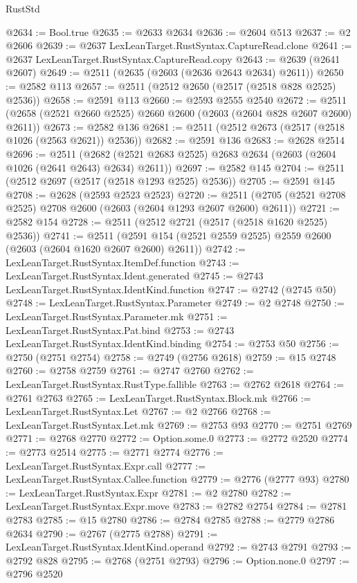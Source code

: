\begin{lexlean}{RustStd}
\begin{coremodule}
@2634 := Bool.true
@2635 := @2633 @2634
@2636 := @2604 @513
@2637 := @2 @2606
@2639 := @2637 LexLeanTarget.RustSyntax.CaptureRead.clone
@2641 := @2637 LexLeanTarget.RustSyntax.CaptureRead.copy
@2643 := @2639 (@2641 @2607)
@2649 := @2511 (@2635 (@2603 (@2636 @2643 @2634) @2611))
@2650 := @2582 @113
@2657 := @2511 (@2512 @2650 (@2517 (@2518 @828 @2525) @2536))
@2658 := @2591 @113
@2660 := @2593 @2555 @2540
@2672 := @2511 (@2658 (@2521 @2660 @2525) @2660 @2600 (@2603 (@2604 @828 @2607 @2600) @2611))
@2673 := @2582 @136
@2681 := @2511 (@2512 @2673 (@2517 (@2518 @1026 (@2563 @2621)) @2536))
@2682 := @2591 @136
@2683 := @2628 @2514
@2696 := @2511
    (@2682 (@2521 @2683 @2525) @2683 @2634 (@2603 (@2604 @1026 (@2641 @2643) @2634) @2611))
@2697 := @2582 @145
@2704 := @2511 (@2512 @2697 (@2517 (@2518 @1293 @2525) @2536))
@2705 := @2591 @145
@2708 := @2628 (@2593 @2523 @2523)
@2720 := @2511 (@2705 (@2521 @2708 @2525) @2708 @2600 (@2603 (@2604 @1293 @2607 @2600) @2611))
@2721 := @2582 @154
@2728 := @2511 (@2512 @2721 (@2517 (@2518 @1620 @2525) @2536))
@2741 := @2511 (@2591 @154 (@2521 @2559 @2525) @2559 @2600 (@2603 (@2604 @1620 @2607 @2600) @2611))
@2742 := LexLeanTarget.RustSyntax.ItemDef.function
@2743 := LexLeanTarget.RustSyntax.Ident.generated
@2745 := @2743 LexLeanTarget.RustSyntax.IdentKind.function
@2747 := @2742 (@2745 @50)
@2748 := LexLeanTarget.RustSyntax.Parameter
@2749 := @2 @2748
@2750 := LexLeanTarget.RustSyntax.Parameter.mk
@2751 := LexLeanTarget.RustSyntax.Pat.bind
@2753 := @2743 LexLeanTarget.RustSyntax.IdentKind.binding
@2754 := @2753 @50
@2756 := @2750 (@2751 @2754)
@2758 := @2749 (@2756 @2618)
@2759 := @15 @2748
@2760 := @2758 @2759
@2761 := @2747 @2760
@2762 := LexLeanTarget.RustSyntax.RustType.fallible
@2763 := @2762 @2618
@2764 := @2761 @2763
@2765 := LexLeanTarget.RustSyntax.Block.mk
@2766 := LexLeanTarget.RustSyntax.Let
@2767 := @2 @2766
@2768 := LexLeanTarget.RustSyntax.Let.mk
@2769 := @2753 @93
@2770 := @2751 @2769
@2771 := @2768 @2770
@2772 := Option.some.{0}
@2773 := @2772 @2520
@2774 := @2773 @2514
@2775 := @2771 @2774
@2776 := LexLeanTarget.RustSyntax.Expr.call
@2777 := LexLeanTarget.RustSyntax.Callee.function
@2779 := @2776 (@2777 @93)
@2780 := LexLeanTarget.RustSyntax.Expr
@2781 := @2 @2780
@2782 := LexLeanTarget.RustSyntax.Expr.move
@2783 := @2782 @2754
@2784 := @2781 @2783
@2785 := @15 @2780
@2786 := @2784 @2785
@2788 := @2779 @2786 @2634
@2790 := @2767 (@2775 @2788)
@2791 := LexLeanTarget.RustSyntax.IdentKind.operand
@2792 := @2743 @2791
@2793 := @2792 @828
@2795 := @2768 (@2751 @2793)
@2796 := Option.none.{0}
@2797 := @2796 @2520

\end{coremodule}
\end{lexlean}
